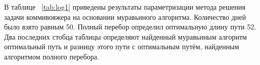 В таблице ~\ref{tab:log1} приведены результаты параметризации метода решения задачи коммивояжера на основании муравьиного алгоритма. Количество дней было взято равным 50. Полный перебор определил оптимальную длину пути 52. Два последних стобца таблицы определяют найденный муравьиным алгоритм оптимальный путь и разницу этого пути с оптимальным путём, найденным алгоритмом полного перебора.

\begin{table}[ht]
    \caption{Таблица коэффициентов для класса данных 1.}
    \begin{minipage}[h!]{0.10\hsize}\centering
        \begin{center}
\end{center}
\end{minipage}
\end{table}

